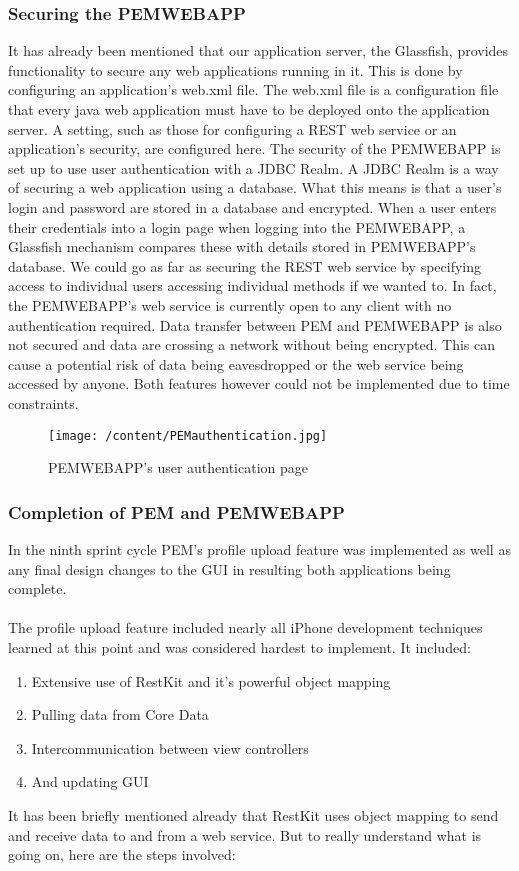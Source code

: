 \documentclass[12pt, a4paper]{report}   %
\begin{document}
\begin{enumerate}
\subsubsection{Securing the PEMWEBAPP}
It has already been mentioned that our application server, the Glassfish, provides functionality to secure any web applications running in it. This is done by configuring an application's web.xml file. The web.xml file is a configuration file that every java web application must have to be deployed onto the application server. A setting, such as those for configuring a REST web service or an application's security, are configured here. The security of the PEMWEBAPP is set up to use user authentication with a JDBC Realm. A JDBC Realm is a way of securing a web application using a database. What this means is that a user's login and password are stored in a database and encrypted. When a user enters their credentials into a login page when logging into the PEMWEBAPP, a Glassfish mechanism compares these with details stored in PEMWEBAPP's database.
We could go as far as securing the REST web service by specifying access to individual users accessing individual methods if we wanted to. In fact, the PEMWEBAPP's web service is currently open to any client with no authentication required. Data transfer between PEM and PEMWEBAPP is also not secured and data are crossing a network without being encrypted. This can cause a potential risk of data being eavesdropped or the web service being accessed by anyone. Both features however could not be implemented due to time constraints.


\begin{figure}[H]
  \centering
	\texttt{[image: /content/PEMauthentication.jpg]}
	  \caption{PEMWEBAPP's user authentication page}
\end{figure}


\subsubsection{Completion of PEM and PEMWEBAPP}
In the ninth sprint cycle PEM's profile upload feature was implemented as well as any final design changes to the GUI in resulting both applications being complete.\\ \\
The profile upload feature included nearly all iPhone development techniques learned at this point and was considered hardest to implement. It included:\\
\begin{enumerate}
	\item Extensive use of RestKit and it's powerful object mapping
	\item Pulling data from Core Data
	\item Intercommunication between view controllers
	\item And updating GUI\\
\end{enumerate}
It has been briefly mentioned already that RestKit uses object mapping to send and receive data to and from a web service. But to really understand what is going on, here are the steps involved:


\end{enumerate}
\end{document}
